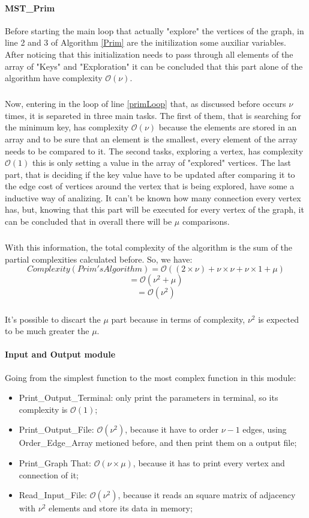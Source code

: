 \documentclass[titlepage]{article}
\begin{document}
    \paragraph{MST\_Prim}
    Before starting the main loop that actually "explore" the vertices of the graph, in line 2 and 3 of Algorithm \ref{Prim} are the initilization some auxiliar variables. After noticing that this initialization needs to pass through all elements of the array of "Keys" and "Exploration" it can be concluded that this part alone of the algorithm have complexity $\mathcal{O}(\nu)$.
    \subparagraph{}
    Now, entering in the loop of line \ref{primLoop} that, as discussed before occurs $\nu$ times, it is separeted in three main tasks. The first of them, that is searching for the minimum key, has complexity $\mathcal{O}(\nu)$ because the elements are stored in an array and to be sure that an element is the smallest, every element of the array needs to be compared to it. The second tasks, exploring a vertex, has complexity $\mathcal{O}(1)$ this is only setting a value in the array of "explored" vertices. The last part, that is deciding if the key value have to be updated after comparing it to the edge cost of vertices around the vertex that is being explored, have some a inductive way of analizing. It can't be known how many connection every vertex has, but, knowing that this part will be executed for every vertex of the graph, it can be concluded that in overall there will be $\mu$ comparisons.
    \subparagraph{}
    With this information, the total complexity of the algorithm is the sum of the partial complexities calculated before. So, we have:
    $$
        Complexity(Prim's Algorithm) = \mathcal{O}((2 \times \nu) + \nu \times \nu + \nu \times 1 + \mu)
    $$
    $$
        = \mathcal{O}(\nu^2 + \mu)
    $$
    $$ 
        = \mathcal{O}(\nu^2)
    $$
    \subparagraph{}
    It's possible to discart the $\mu$ part because in terms of complexity, $\nu^2$ is expected to be much greater the $\mu$.
    \paragraph{Input and Output module}
    Going from the simplest function to the most complex function in this module:
    \begin{itemize}
        \item Print\_Output\_Terminal: only print the parameters in terminal, so its complexity is $\mathcal{O}(1)$;
        \item Print\_Output\_File: $\mathcal{O}(\nu^2)$, because it have to order $\nu-1$ edges, using Order\_Edge\_Array metioned before, and then print them on a output file;
        \item Print\_Graph That: $\mathcal{O}(\nu \times \mu)$, because it has to print every vertex and connection of it;
        \item Read\_Input\_File: $\mathcal{O}(\nu^2)$, because it reads an square matrix of adjacency with $\nu^2$ elements and store its data in memory;
    \end{itemize}
\end{document}
